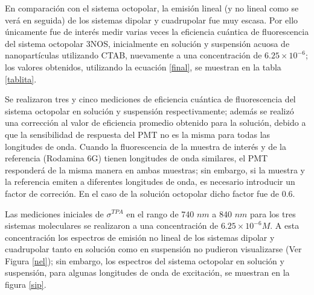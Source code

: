 En comparaci\'on con el sistema octopolar, la emisi\'on lineal (y no lineal como se ver\'a en seguida) de los sistemas dipolar y cuadrupolar fue muy escasa. Por ello \'unicamente fue de inter\'es medir varias veces la eficiencia cu\'antica de fluorescencia del sistema octopolar 3NOS, inicialmente en soluci\'on y suspensi\'on acuosa de nanopart\'iculas utilizando CTAB, nuevamente a una concentraci\'on de $6.25 \times 10^{-6}$; los valores obtenidos, utilizando la ecuaci\'on \ref{final}, se muestran en la tabla \ref{tablita}. 

Se realizaron tres y cinco mediciones de eficiencia cu\'antica de fluorescencia del sistema octopolar en soluci\'on y suspensi\'on respectivamente; adem\'as se realiz\'o una correcci\'on al valor de eficiencia promedio obtenido para la soluci\'on, debido a que la sensibilidad de respuesta del PMT no es la misma para todas las longitudes de onda. Cuando la fluorescencia de la muestra de inter\'es y de la referencia (Rodamina 6G) tienen longitudes de onda similares, el PMT responder\'a de la misma manera en ambas muestras; sin embargo, si la muestra y la referencia emiten a diferentes longitudes de onda, es necesario introducir un factor de correci\'on. En el caso de la soluci\'on octopolar dicho factor fue de 0.6.

\begin{table}[H]
\centering
{} 
\caption{ Valores obtenidos de eficiencia cu\'antica de fluorescencia $\Phi$ para el sistema octopolar  \label{tablita}}
\end{table}


Las mediciones iniciales de $\sigma^{TPA}$ en el rango de 740 $nm$ a 840 $nm$ para los tres sistemas moleculares se realizaron a una concentraci\'on de $6.25\times 10^{-6} M$. A esta concentraci\'on los espectros de emisi\'on no lineal de los sistemas dipolar y cuadrupolar tanto en soluci\'on como en suspensi\'on no pudieron visualizarse (Ver Figura \ref{nel}); sin embargo, los espectros del sistema octopolar en soluci\'on y suspensi\'on, para algunas longitudes de onda de excitaci\'on, se muestran en la figura \ref{sip}.

